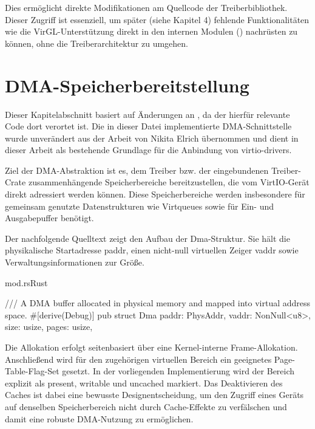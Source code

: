 Dies ermöglicht direkte Modifikationen am Quellcode der Treiberbibliothek. Dieser Zugriff ist essenziell, um später (siehe Kapitel 4) fehlende Funktionalitäten wie die VirGL-Unterstützung direkt in den internen Modulen () nachrüsten zu können, ohne die Treiberarchitektur zu umgehen.

\clearpage

\section{DMA-Speicherbereitstellung}

Dieser Kapitelabschnitt basiert auf Änderungen an , da der hierfür relevante Code dort verortet ist. Die in dieser Datei implementierte DMA-Schnittstelle wurde unverändert aus der Arbeit von Nikita Elrich übernommen und dient in dieser Arbeit als bestehende Grundlage für die Anbindung von virtio-drivers.

Ziel der DMA-Abstraktion ist es, dem Treiber bzw. der eingebundenen Treiber-Crate zusammenhängende Speicherbereiche bereitzustellen, die vom VirtIO-Gerät direkt adressiert werden können. Diese Speicherbereiche werden insbesondere für gemeinsam genutzte Datenstrukturen wie Virtqueues sowie für Ein- und Ausgabepuffer benötigt.

Der nachfolgende Quelltext zeigt den Aufbau der Dma-Struktur. Sie hält die physikalische Startadresse paddr, einen nicht-null virtuellen Zeiger vaddr sowie Verwaltungsinformationen zur Größe.
\begin{codeblock}{mod.rs}{Rust}
  \begin{rustcode}
/// A DMA buffer allocated in physical memory and mapped into virtual address space.
#[derive(Debug)]
pub struct Dma {
    paddr: PhysAddr,
    vaddr: NonNull<u8>,
    size: usize,
    pages: usize,
}
  \end{rustcode}
\end{codeblock}

Die Allokation erfolgt seitenbasiert über eine Kernel-interne Frame-Allokation. Anschließend wird für den zugehörigen virtuellen Bereich ein geeignetes Page-Table-Flag-Set gesetzt. In der vorliegenden Implementierung wird der Bereich explizit als present, writable und uncached markiert. Das Deaktivieren des Caches ist dabei eine bewusste Designentscheidung, um den Zugriff eines Geräts auf denselben Speicherbereich nicht durch Cache-Effekte zu verfälschen und damit eine robuste DMA-Nutzung zu ermöglichen.


